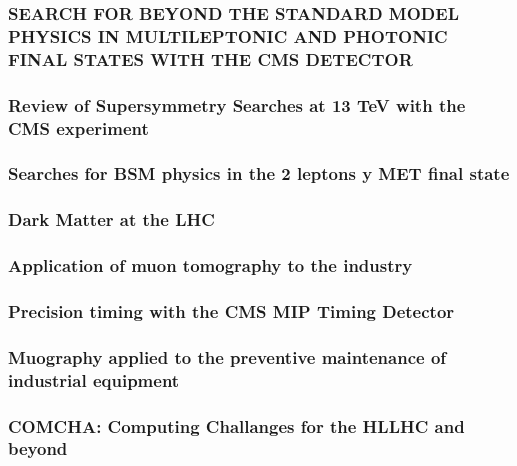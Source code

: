 \documentclass[a4paper, 11pt, twoside, openright]{report}
\begin{document}
\subsubsection{SEARCH FOR BEYOND THE STANDARD MODEL PHYSICS IN MULTILEPTONIC AND PHOTONIC FINAL STATES WITH THE CMS DETECTOR}

\subsubsection{Review of Supersymmetry Searches at 13 TeV with the CMS experiment}

\subsubsection{Searches for BSM physics in the 2 leptons y MET final state}

\subsubsection{Dark Matter at the LHC}

\subsubsection{Application of muon tomography to the industry}

\subsubsection{Precision timing with the CMS MIP Timing Detector}

\subsubsection{Muography applied to the preventive maintenance of industrial equipment}

\subsubsection{COMCHA: Computing Challanges for the HLLHC and beyond}

\end{document}
